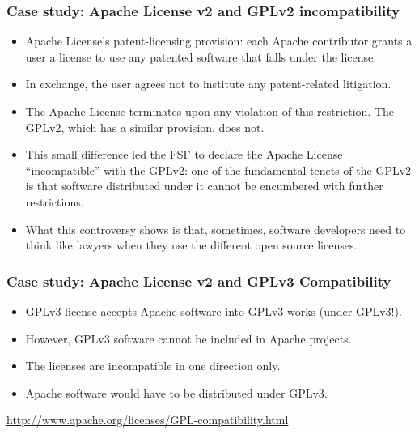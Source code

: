 \begin{frame}
\frametitle{Case study: Apache License v2 and GPLv2 incompatibility}


\begin{itemize}
\item Apache License’s patent-licensing provision: each Apache contributor grants a user a license to use any patented software that falls under the license 
\item In exchange, the user agrees not to institute any patent-related litigation. 
\item The Apache License terminates upon any violation of this restriction. The GPLv2, which has a similar provision, does not.
\item This small difference led the FSF to declare the Apache License ``incompatible'' with the GPLv2: one of the fundamental tenets of the GPLv2 is that software distributed under it cannot be encumbered with further restrictions. 
\item What this controversy shows is that, sometimes, software developers need to think like lawyers when they use the different open source licenses. 
\end{itemize}

\end{frame}


\begin{frame}
\frametitle{Case study: Apache License v2 and GPLv3 Compatibility}


\begin{itemize}
\item GPLv3 license accepts Apache software into GPLv3 works (under GPLv3!).
\item However, GPLv3 software cannot be included in Apache projects. 
\item The licenses are incompatible in \alert{one direction} only. 
\item Apache software would have to be distributed under GPLv3.
\end{itemize}

\url{http://www.apache.org/licenses/GPL-compatibility.html}

\end{frame}




